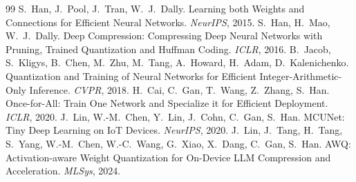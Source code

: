 \documentclass[11pt,a4paper]{ctexart}
\begin{document}
\begin{thebibliography}{99}
 S.~Han, J.~Pool, J.~Tran, W.~J.~Dally. Learning both Weights and Connections for Efficient Neural Networks. \emph{NeurIPS}, 2015.
 S.~Han, H.~Mao, W.~J.~Dally. Deep Compression: Compressing Deep Neural Networks with Pruning, Trained Quantization and Huffman Coding. \emph{ICLR}, 2016.
 B.~Jacob, S.~Kligys, B.~Chen, M.~Zhu, M.~Tang, A.~Howard, H.~Adam, D.~Kalenichenko. Quantization and Training of Neural Networks for Efficient Integer-Arithmetic-Only Inference. \emph{CVPR}, 2018.
 H.~Cai, C.~Gan, T.~Wang, Z.~Zhang, S.~Han. Once-for-All: Train One Network and Specialize it for Efficient Deployment. \emph{ICLR}, 2020.
 J.~Lin, W.-M.~Chen, Y.~Lin, J.~Cohn, C.~Gan, S.~Han. MCUNet: Tiny Deep Learning on IoT Devices. \emph{NeurIPS}, 2020.
 J.~Lin, J.~Tang, H.~Tang, S.~Yang, W.-M.~Chen, W.-C.~Wang, G.~Xiao, X.~Dang, C.~Gan, S.~Han. AWQ: Activation-aware Weight Quantization for On-Device LLM Compression and Acceleration. \emph{MLSys}, 2024.
\end{thebibliography}
\end{document}

